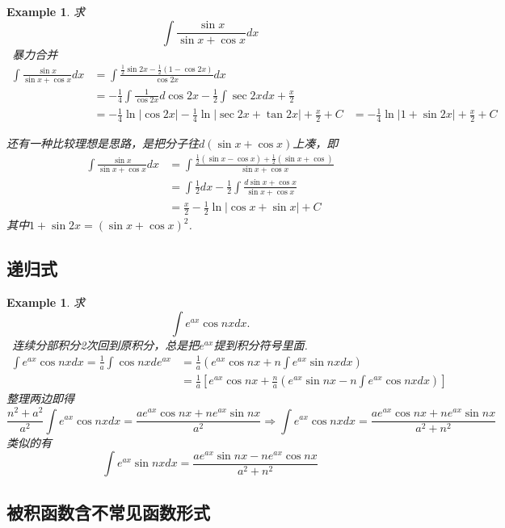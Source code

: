 \documentclass{article}
\newtheorem{example}[theorem]{Example}
\newcommand{\hints}{{\color{blue} \text{hints}}}
\begin{document}
\begin{example}
\rm 求
$$
\int \frac{\sin x}{\sin x + \cos x}dx
$$
\hints\ 暴力合并
$$
\begin{aligned}
\int \frac{\sin x}{\sin x + \cos x}dx &= \int \frac{\frac{1}{2}\sin 2x-\frac{1}{2}(1-\cos 2x)}{\cos 2x} dx \\
&= -\frac{1}{4}\int \frac{1}{\cos 2x}d \cos 2x-\frac{1}{2}\int \sec 2x dx + \frac{x}{2} \\
&=  -\frac{1}{4}\ln |\cos 2x|-\frac{1}{4}\ln |\sec 2x + \tan 2x| + \frac{x}{2} + C
&= -\frac{1}{4} \ln |1 + \sin 2x| + \frac{x}{2} + C
\end{aligned}
$$

还有一种比较理想是思路，是把分子往$d(\sin x + \cos x)$上凑，即
$$
\begin{aligned}
\int \frac{\sin x}{\sin x + \cos x}dx &= \int \frac{\frac{1}{2}(\sin x - \cos x) +  \frac{1}{2}(\sin x +\cos)}{\sin x + \cos x} \\
&= \int \frac{1}{2} dx - \frac{1}{2}\int\frac{d{\sin x+\cos x}}{\sin x + \cos x} \\
& = \frac{x}{2}-\frac{1}{2}\ln |\cos x + \sin x| + C
\end{aligned}
$$
其中$1+\sin 2x = (\sin x + \cos x)^2$. 
\end{example}

\subsection{递归式}

\begin{example}
\rm 求
$$
\int e^{ax}\cos nx dx.
$$
\hints\ 连续分部积分2次回到原积分，总是把$e^{ax}$提到积分符号里面. 
$$
\begin{array}{ll}
\int e^{ax}\cos nx dx = \frac{1}{a}\int \cos nx d e^{ax}  &= \frac{1}{a}\left(e^{ax}\cos nx + n \int e^{ax}\sin nx dx \right) \\
&= \frac{1}{a}\left[ e^{ax}\cos nx + \frac{n}{a} \left( e^{ax}\sin nx - n\int e^{ax}\cos nxdx \right) \right]
\end{array}
$$
整理两边即得
$$
\frac{n^2 + a^2}{a^2} \int e^{ax}\cos nx dx = \frac{ae^{ax}\cos nx + ne^{ax}\sin nx}{a^2} \Rightarrow \int e^{ax}\cos nx dx = \frac{ae^{ax}\cos nx + ne^{ax}\sin nx}{a^2+n^2}
$$
类似的有
$$
\int e^{ax}\sin nx dx = \frac{ae^{ax}\sin nx - ne^{ax}\cos nx}{a^2+n^2}
$$
\end{example}


\subsection{被积函数含不常见函数形式}
\end{document}
